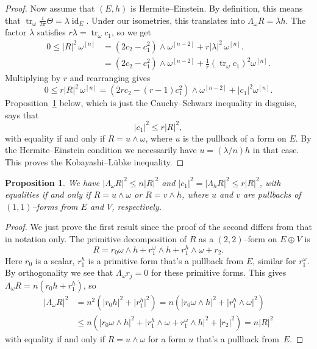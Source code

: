 \documentclass[11pt,a4paper]{amsart}
\def\^#1{^{[#1]}}
\DeclareMathOperator{\tr}{tr}
\DeclareMathOperator{\id}{id}
\def\curv{\frac{i}{2\pi} \Theta}
\newtheorem{prop}[theo]{Proposition}
\theoremstyle{definition}
\theoremstyle{remark}
\numberwithin{equation}{section}
\begin{document}
\begin{proof}
Now assume that $(E,h)$ is Hermite--Einstein. By definition, this means
that $\tr_\omega \curv = \lambda \id_{E}$. Under our isometries, this
translates into $\Lambda_\omega R = \lambda h$. The factor $\lambda$
satisfies $r \lambda = \tr_\omega c_1$, so we get
\begin{align*}
    0 \leq 
    \lvert R \rvert^2 \, \omega\^{n}
    &= (2 c_2 - c_1^2) \wedge \omega\^{n-2}
    + r |\lambda|^2 \, \omega\^{n}.
    \\
    &= (2 c_2 - c_1^2) \wedge \omega\^{n-2}
    + \tfrac 1r (\tr_\omega c_1)^2 \omega\^{n}.
\end{align*}
Multiplying by $r$ and rearranging gives 
$$
0 \leq
r \lvert R \rvert^2 \, \omega\^{n}
= (2r c_2 - (r-1)c_1^2) \wedge \omega\^{n-2}
+ \lvert c_1 \rvert^2 \omega\^{n}.
$$
Proposition~\ref{prop:CS} below, which is just the Cauchy--Schwarz
inequality in disguise, says that
$$
\lvert c_1 \rvert^2 \leq r \lvert R \rvert^2,
$$
with equality if and only if $R = u \wedge \omega$, where $u$ is the
pullback of a form on $E$. By the Hermite--Einstein condition we
necessarily have $u = (\lambda/n) h$ in that case. This proves the
Kobayashi--L\"{u}bke inequality.
\end{proof}



\begin{prop}
\label{prop:CS}
We have $\lvert \Lambda_\omega R\rvert^2 \leq n \lvert R \rvert^2$ and
$\lvert c_1 \rvert^2 = \lvert \Lambda_h R\rvert^2 \leq r \lvert R
\rvert^2$, with equalities if and only if $R = u \wedge \omega$ or $R = v
\wedge h$, where $u$ and $v$ are pullbacks of $(1,1)$--forms from $E$ and
$V$, respectively. 
\end{prop}

\begin{proof}
    We just prove the first result since the proof of the second
differs from that in notation only.  The primitive decomposition of
$R$ as a $(2,2)$--form on $E \oplus V$ is 
$$
R = r_0 \omega \wedge h + r_1^\omega \wedge h + r_1^h \wedge \omega
+ r_2.
$$
Here $r_0$ is a scalar, $r_1^h$ is a primitive form that's a pullback from
$E$, similar for $r_1^\omega$. By orthogonality we see that $\Lambda_\omega
r_j = 0$ for these primitive forms. This gives 
$\Lambda_\omega R = n (r_0 h + r_1^h)$,
so
\begin{align*}
\lvert \Lambda_\omega R \rvert^2 
&= n^2 (\lvert r_0 h\rvert^2 +\lvert r_1^h\rvert^2)
= n (\lvert r_0 \omega \wedge h\rvert^2 
+ \lvert r_1^h \wedge \omega \rvert^2)
\\
&\leq
n(\lvert r_0 \omega \wedge h \rvert^2 
+ \lvert r_1^h \wedge \omega 
+ r_1^\omega \wedge h \rvert^2 
+ \lvert r_2 \rvert^2 )
= n \lvert R \rvert^2
\end{align*}
with equality if and only if $R = u \wedge \omega$ for a form $u$
that's a pullback from~$E$.%
\end{proof}
\end{document}

